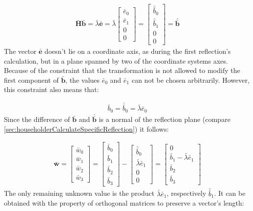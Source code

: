 \begin{align}
\mathbf{\bar{H}} \mathbf{\bar{b}} 
= 
\bar{\lambda} \mathbf{\bar{e}}
= 
\bar{\lambda} 
\begin{bmatrix}
\bar{e}_0\\
\bar{e}_1\\
0\\
0
\end{bmatrix}
=  
\begin{bmatrix}
\bar{\bar{b}}_0\\
\bar{\bar{b}}_1\\
0\\
0
\end{bmatrix}
= 
\mathbf{\bar{\bar{b}}} 
\end{align}
%
The vector $\mathbf{\bar{e}}$ doesn't lie on a coordinate axis, as during the first reflection's calculation, but in a plane spanned by two of the coordinate systems axes.
Because of the constraint that the transformation is not allowed to modify the first component of $\mathbf{\bar{b}}$, the values $\bar{e}_0$ and $\bar{e}_1$ can not be chosen arbitrarily.
However, this constraint also means that:

\begin{align}
\bar{b}_0 = \bar{\bar{b}}_0 = \bar{\lambda}\bar{e}_0
\end{align}
%
Since the difference of $\mathbf{\bar{b}}$ and $\mathbf{\bar{\bar{b}}}$ is a normal of the reflection plane (compare \cref{sec:householderCalculateSpecificReflection}) it follows:

\begin{align}
\mathbf{\bar{w}}
= 
\begin{bmatrix}
\bar{w}_0\\
\bar{w}_1\\
\bar{w}_2\\
\bar{w}_3
\end{bmatrix}
= 
\begin{bmatrix}
\bar{b}_0\\
\bar{b}_1\\
\bar{b}_2\\
\bar{b}_3
\end{bmatrix}
-
\begin{bmatrix}
\bar{\bar{b}}_0\\
\bar{\lambda}\bar{e}_1\\
0\\
0
\end{bmatrix}
=
\begin{bmatrix}
0\\
\bar{b}_1 - \bar{\lambda}\bar{e}_1\\
\bar{b}_2\\
\bar{b}_3
\end{bmatrix}
\end{align}
%
The only remaining unknown value is the product $\bar{\lambda}\bar{e}_1$, respectively $\bar{\bar{b}}_1$.
It can be obtained with the property of orthogonal matrices to preserve a vector's length:

